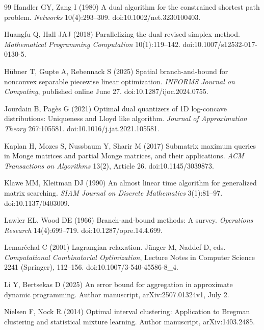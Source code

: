 \begin{thebibliography}{99}
Handler GY, Zang I (1980) A dual algorithm for the constrained shortest path problem. \emph{Networks} 10(4):293--309. doi:10.1002/net.3230100403.

Huangfu Q, Hall JAJ (2018) Parallelizing the dual revised simplex method. \emph{Mathematical Programming Computation} 10(1):119--142. doi:10.1007/s12532-017-0130-5.

H{\"u}bner T, Gupte A, Rebennack S (2025) Spatial branch-and-bound for nonconvex separable piecewise linear optimization. \emph{INFORMS Journal on Computing}, published online June 27. doi:10.1287/ijoc.2024.0755.

Jourdain B, Pag\`es G (2021) Optimal dual quantizers of 1D log-concave distributions: Uniqueness and Lloyd like algorithm. \emph{Journal of Approximation Theory} 267:105581. doi:10.1016/j.jat.2021.105581.

Kaplan H, Mozes S, Nussbaum Y, Sharir M (2017) Submatrix maximum queries in Monge matrices and partial Monge matrices, and their applications. \emph{ACM Transactions on Algorithms} 13(2), Article 26. doi:10.1145/3039873.

Klawe MM, Kleitman DJ (1990) An almost linear time algorithm for generalized matrix searching. \emph{SIAM Journal on Discrete Mathematics} 3(1):81--97. doi:10.1137/0403009.

Lawler EL, Wood DE (1966) Branch-and-bound methods: A survey. \emph{Operations Research} 14(4):699--719. doi:10.1287/opre.14.4.699.

Lemar\'echal C (2001) Lagrangian relaxation. J\"unger M, Naddef D, eds. \emph{Computational Combinatorial Optimization}, Lecture Notes in Computer Science 2241 (Springer), 112--156. doi:10.1007/3-540-45586-8\_4.

Li Y, Bertsekas D (2025) An error bound for aggregation in approximate dynamic programming. Author manuscript, arXiv:2507.01324v1, July 2.

Nielsen F, Nock R (2014) Optimal interval clustering: Application to Bregman clustering and statistical mixture learning. Author manuscript, arXiv:1403.2485.


\end{thebibliography}

